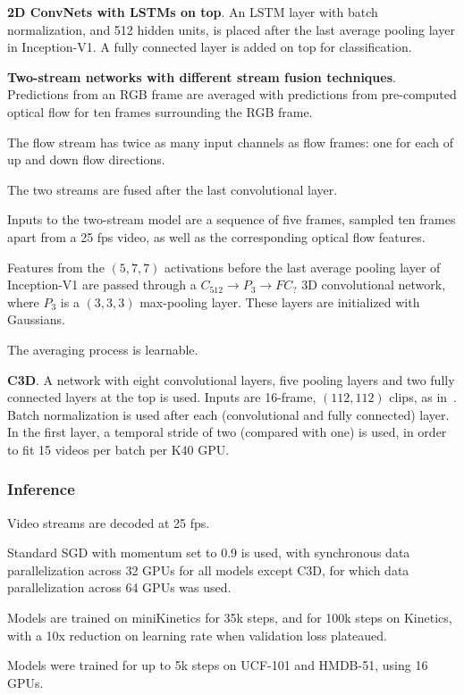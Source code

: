\documentclass[a4paper, 12pt]{article}
\begin{document}
\textbf{2D ConvNets with LSTMs on top}. An LSTM layer with batch normalization,
and 512 hidden units, is placed after the last average pooling layer in
Inception-V1. A fully connected layer is added on top for classification.

\textbf{Two-stream networks with different stream fusion techniques}.
Predictions from an RGB frame are averaged with predictions from pre-computed
optical flow for ten frames surrounding the RGB frame.

The flow stream has twice as many input channels as flow frames: one for each
of up and down flow directions.

The two streams are fused after the last convolutional layer.

Inputs to the two-stream model are a sequence of five frames, sampled ten
frames apart from a 25 fps video, as well as the corresponding optical flow
features.

Features from the $(5, 7, 7)$ activations before the last average pooling layer
of Inception-V1 are passed through a $C_{512} \rightarrow P_3 \rightarrow FC_{?}$ 3D
convolutional network, where $P_3$ is a $(3, 3, 3)$ max-pooling layer. These
layers are initialized with Gaussians.

The averaging process is learnable.

\textbf{C3D}. A network with eight convolutional layers, five pooling layers
and two fully connected layers at the top is used. Inputs are 16-frame,
$(112, 112)$ clips, as in~\cite{DBLP:journals/corr/TranBFTP14}. Batch
normalization is used after each (convolutional and fully connected) layer. In
the first layer, a temporal stride of two (compared with one) is used, in order
to fit 15 videos per batch per K40 GPU\@.

\subsubsection{Inference}

Video streams are decoded at 25 fps.

Standard SGD with momentum set to 0.9 is used, with synchronous data
parallelization across 32 GPUs for all models except C3D, for which data
parallelization across 64 GPUs was used.

Models are trained on miniKinetics for 35k steps, and for 100k steps on
Kinetics, with a 10x reduction on learning rate when validation loss plateaued.

Models were trained for up to 5k steps on UCF-101 and HMDB-51, using 16 GPUs.
\end{document}
